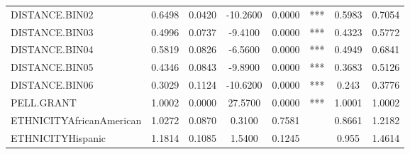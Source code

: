 \documentclass[12pt,english]{report}
\begin{document}
\begin{table}[H]
\begin{adjustbox}{width=0.95\textwidth}
\begin{tabular}{|lccclccc|}
DISTANCE.BIN02                  & 0.6498   & 0.0420     & -10.2600 & 0.0000    & ***         & 0.5983 & 0.7054  \\
DISTANCE.BIN03                  & 0.4996   & 0.0737     & -9.4100  & 0.0000    & ***         & 0.4323 & 0.5772  \\
DISTANCE.BIN04                  & 0.5819   & 0.0826     & -6.5600  & 0.0000    & ***         & 0.4949 & 0.6841  \\
DISTANCE.BIN05                  & 0.4346   & 0.0843     & -9.8900  & 0.0000    & ***         & 0.3683 & 0.5126  \\
DISTANCE.BIN06                  & 0.3029   & 0.1124     & -10.6200 & 0.0000    & ***         & 0.243  & 0.3776  \\
PELL.GRANT                      & 1.0002   & 0.0000     & 27.5700  & 0.0000    & ***         & 1.0001 & 1.0002  \\
ETHNICITYAfricanAmerican & 1.0272   & 0.0870     & 0.3100   & 0.7581    &             & 0.8661 & 1.2182  \\
ETHNICITYHispanic               & 1.1814   & 0.1085     & 1.5400   & 0.1245    &             & 0.955  & 1.4614  \\

\end{tabular}
\end{adjustbox}
\end{table}
\end{document}
